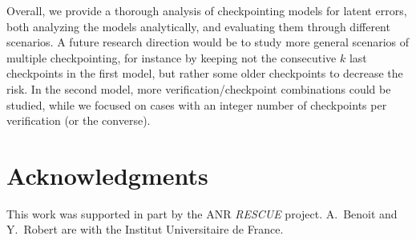 \documentclass[10pt,table]{article}
\begin{document}
Overall, we provide a thorough analysis of checkpointing models for latent errors,
both analyzing the models analytically, and evaluating them through different scenarios. 
A future research direction would be to study more general scenarios of multiple checkpointing,
for instance by keeping not the consecutive $k$ last checkpoints in the first model, but rather 
some older checkpoints to decrease the risk. In the second model, more 
verification/checkpoint combinations could be studied, while we focused on cases 
with an integer number of checkpoints per verification (or the converse). 



\section*{Acknowledgments}
This work was supported in part by the ANR {\em RESCUE} project. 
A.~Benoit and Y.~Robert are with the Institut Universitaire de France.




\end{document}
